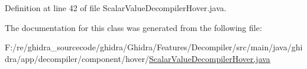 Definition at line 42 of file Scalar\+Value\+Decompiler\+Hover.\+java.



The documentation for this class was generated from the following file\+:\begin{DoxyCompactItemize}
\item 
F\+:/re/ghidra\+\_\+sourcecode/ghidra/\+Ghidra/\+Features/\+Decompiler/src/main/java/ghidra/app/decompiler/component/hover/\mbox{\hyperlink{_scalar_value_decompiler_hover_8java}{Scalar\+Value\+Decompiler\+Hover.\+java}}\end{DoxyCompactItemize}
